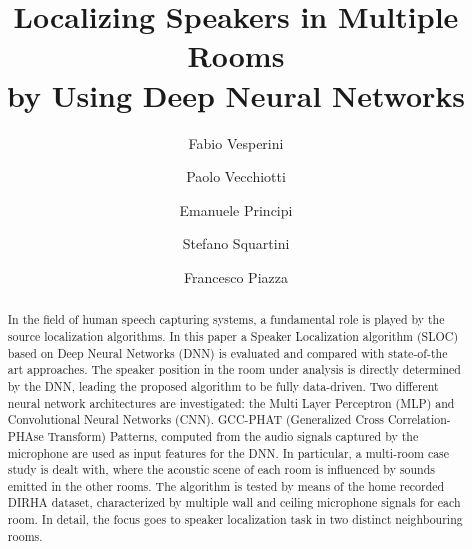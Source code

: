 \documentclass[review]{elsarticle}
\begin{document}
\begin{frontmatter}






\title{Localizing Speakers in Multiple Rooms \\ by Using Deep Neural Networks}

\author{Fabio Vesperini}
\author{Paolo Vecchiotti} 
\author{Emanuele Principi} 
\author{Stefano Squartini} 
\author{Francesco Piazza} 
\address{Department of Information Engineering, Universit\`a Politecnica delle Marche, Via Brecce Bianche, 60131, Ancona, Italy}

\begin{abstract}
In the field of human speech capturing systems, a fundamental role is played by the source localization algorithms. In this paper a Speaker Localization algorithm (SLOC) based on Deep Neural Networks (DNN) is evaluated and compared with state-of-the art approaches. The speaker position in the room under analysis is directly determined by the DNN, leading the proposed algorithm to be fully data-driven. Two different neural network architectures are investigated: the Multi Layer Perceptron (MLP) and Convolutional Neural Networks (CNN). GCC-PHAT (Generalized Cross Correlation-PHAse Transform) Patterns, computed from the audio signals captured by the microphone  are used as input features for the DNN.  
In particular, a multi-room case study is dealt with, where the acoustic scene of each room is influenced by sounds emitted in the other rooms.
The algorithm is tested by means of the home recorded DIRHA dataset, characterized by multiple wall and ceiling microphone signals for each room. In detail, the focus goes to speaker localization task in two distinct neighbouring rooms.%


\end{abstract}
\end{frontmatter}
\end{document}
